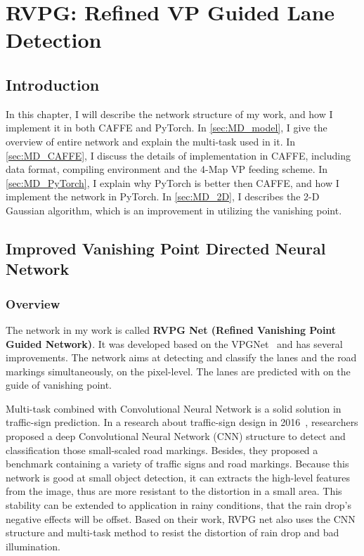 
\chapter{RVPG: Refined VP Guided Lane Detection}
\label{cha:model}
\begin{spacing}{1.5}
\setlength{\parskip}{0.3in}

\section{Introduction}

In this chapter, I will describe the network structure of my work, and how I implement it in both CAFFE and PyTorch. In \autoref{sec:MD_model}, I give the overview of entire network and explain the multi-task used in it. In \autoref{sec:MD_CAFFE}, I discuss the details of implementation in CAFFE, including data format, compiling environment and the 4-Map VP feeding scheme. In \autoref{sec:MD_PyTorch}, I explain why PyTorch is better then CAFFE, and how I implement the network in PyTorch. In \autoref{sec:MD_2D}, I describes the 2-D Gaussian algorithm, which is an improvement in utilizing the vanishing point.

\section{Improved Vanishing Point Directed Neural Network}
\label{sec:MD_model}

\subsection{Overview}
The network in my work is called \textbf{RVPG Net (Refined Vanishing Point Guided Network)}. It was developed based on the VPGNet~\cite{lee2017vpgnet} and has several improvements. The network aims at detecting and classify the lanes and the road markings simultaneously, on the pixel-level. The lanes are predicted with on the guide of vanishing point. 

Multi-task combined with Convolutional Neural Network is a solid solution in traffic-sign prediction. In a research about traffic-sign design in 2016~\cite{zhu2016traffic, huval2015empirical}, researchers proposed a deep Convolutional Neural Network (CNN) structure to detect and classification those small-scaled road markings. Besides, they proposed a benchmark containing a variety of traffic signs and road markings. Because this network is good at small object detection, it can extracts the high-level features from the image, thus are more resistant to the distortion in a small area. This stability can be extended to application in rainy conditions, that the rain drop's negative effects will be offset. Based on their work, RVPG net also uses the CNN structure and multi-task method to resist the distortion of rain drop and bad illumination.


\end{spacing}
